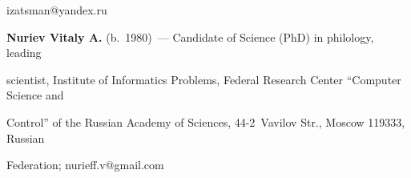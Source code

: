 \mbox{izatsman@yandex.ru}


  


  \vspace*{3pt}


  


  


  \noindent


  \textbf{Nuriev Vitaly A.} (b.\ 1980)~--- Candidate of Science (PhD) in philology, leading 


scientist, Institute of Informatics Problems, Federal Research Center ``Computer Science and 


Control'' of the Russian Academy of Sciences, 44-2~Vavilov Str., Moscow 119333, Russian 


Federation; \mbox{nurieff.v@gmail.com}


 


\label{end\stat}





\renewcommand{\bibname}{\protect\rm Литература} 


